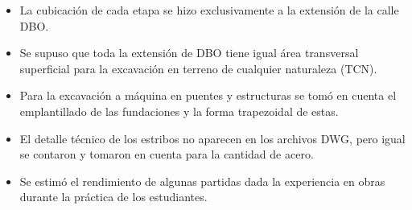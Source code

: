 \begin{itemize}
    \item La cubicación de cada etapa se hizo exclusivamente a la extensión de la calle DBO.
    \item Se supuso que toda la extensión de DBO tiene igual área transversal superficial para la excavación en terreno de cualquier naturaleza (TCN).
    \item Para la excavación a máquina en puentes y estructuras se tomó en cuenta el emplantillado de las fundaciones y la forma trapezoidal de estas.
    \item El detalle técnico de los estribos no aparecen en los archivos DWG, pero igual se contaron y tomaron en cuenta para la cantidad de acero.
    \item Se estimó el rendimiento de algunas partidas dada la experiencia en obras durante la práctica de los estudiantes.
\end{itemize}

